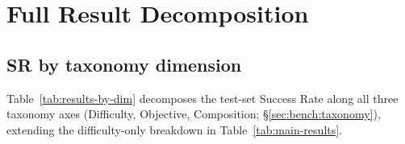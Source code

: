 \section{Full Result Decomposition}\label{app:results-detail}

\subsection{SR by taxonomy dimension}

Table~\ref{tab:results-by-dim} decomposes the test-set Success Rate along all three taxonomy axes (Difficulty, Objective, Composition; §\ref{sec:bench:taxonomy}), extending the difficulty-only breakdown in Table~\ref{tab:main-results}.

